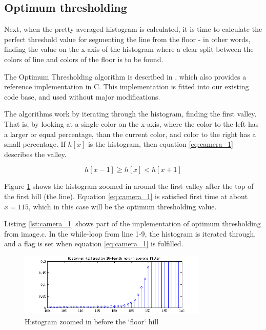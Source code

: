 
%
%
%
%
\subsection{Optimum thresholding}

Next, when the pretty averaged histogram is calculated, it is time to calculate the perfect threshold value for segmenting the line from the floor - in other words, finding the value on the x-axis of the histogram where a clear split between the colors of line and colors of the floor is to be found.

The Optimum Thresholding algorithm is described in \citep{myler1993}, which also provides a reference implementation in C. This implementation is fitted into our existing code base, and used without major modifications.  

The algorithms work by iterating through the histogram, finding the first valley. That is, by looking at a single color on the x-axis, where the color to the left has a larger or equal percentage, than the current color, and color to the right has a small percentage. If $h[x]$ is the histogram, then equation \ref{eq:camera_1} describes the valley.

\begin{equation}\label{eq:camera_1}
	h[x-1] \geq h[x] < h[x+1]
\end{equation}

Figure \ref{fig:camera_5} shows the histogram zoomed in around the first valley after the top of the first hill (the line). Equation \ref{eq:camera_1} is satisfied first time at about $x = 115$, which in this case will be the optimum thresholding value.

Listing \ref{lst:camera_1} shows part of the implementation of optimum thresholding from image.c. In the while-loop from line 1-9, the histogram is iterated through, and a flag is set when equation \ref{eq:camera_1} is fulfilled.

\begin{figure}[!h]
	\centering
	\includegraphics[width=0.8\textwidth]{resources/hist-zoom-valley}
	\caption{Histogram zoomed in before the `floor` hill}
	\label{fig:camera_5}
\end{figure}


